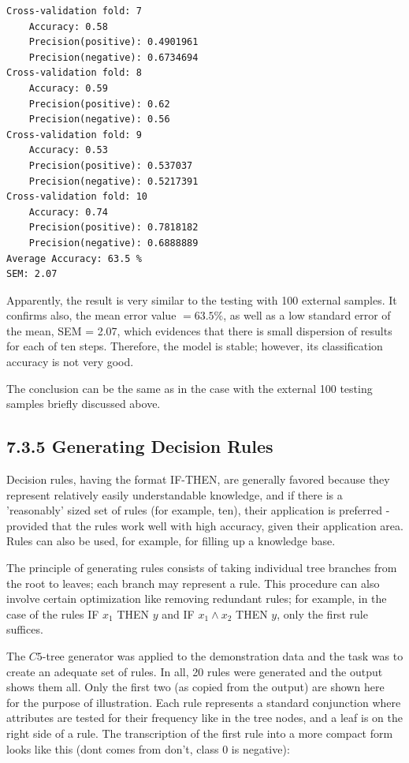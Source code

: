 \documentclass[10pt]{book}
\begin{document}
\begin{verbatim}
Cross-validation fold: 7
    Accuracy: 0.58
    Precision(positive): 0.4901961
    Precision(negative): 0.6734694
Cross-validation fold: 8
    Accuracy: 0.59
    Precision(positive): 0.62
    Precision(negative): 0.56
Cross-validation fold: 9
    Accuracy: 0.53
    Precision(positive): 0.537037
    Precision(negative): 0.5217391
Cross-validation fold: 10
    Accuracy: 0.74
    Precision(positive): 0.7818182
    Precision(negative): 0.6888889
Average Accuracy: 63.5 %
SEM: 2.07
\end{verbatim}

Apparently, the result is very similar to the testing with 100 external samples. It confirms also, the mean error value $=63.5 \%$, as well as a low standard error of the mean, SEM = 2.07, which evidences that there is small dispersion of results for each of ten steps. Therefore, the model is stable; however, its classification accuracy is not very good.

The conclusion can be the same as in the case with the external 100 testing samples briefly discussed above.

\subsection*{7.3.5 Generating Decision Rules}
Decision rules, having the format IF-THEN, are generally favored because they represent relatively easily understandable knowledge, and if there is a 'reasonably' sized set of rules (for example, ten), their application is preferred - provided that the rules work well with high accuracy, given their application area. Rules can also be used, for example, for filling up a knowledge base.

The principle of generating rules consists of taking individual tree branches from the root to leaves; each branch may represent a rule. This procedure can also involve certain optimization like removing redundant rules; for example, in the case of the rules IF $x_{1}$ THEN $y$ and IF $x_{1} \wedge x_{2}$ THEN $y$, only the first rule suffices.

The $C 5$-tree generator was applied to the demonstration data and the task was to create an adequate set of rules. In all, 20 rules were generated and the output shows them all. Only the first two (as copied from the output) are shown here\\
for the purpose of illustration. Each rule represents a standard conjunction where attributes are tested for their frequency like in the tree nodes, and a leaf is on the right side of a rule. The transcription of the first rule into a more compact form looks like this (dont comes from don't, class 0 is negative):
\end{document}
